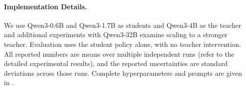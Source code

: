 \vspace{-0.5em}
\paragraph{Implementation Details.}
We use Qwen3-0.6B and Qwen3-1.7B as students and Qwen3-4B as the teacher~\citep{abs-2505-09388} and additional experiments with Qwen3-32B examine scaling to a stronger teacher.
Evaluation uses the student policy alone, with no teacher intervention.
All reported numbers are means over multiple independent runs (refer to the detailed experimental results), and the reported uncertainties are standard deviations across those runs. 
Complete hyperparameters and prompts are given in . 

\begin{table}[t]
\centering 
\caption{Results on tool-integrated reasoning benchmarks. Bold and underlined values denote the best and second-best results, respectively.}
\label{tab:tir_results}
\end{table}
